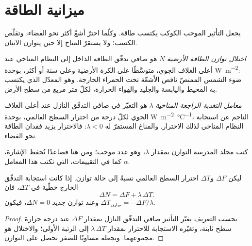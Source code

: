 \section{ميزانية الطاقة}\label{sec:b2:anthropogenic-climate-change:energy}

يجعل التأثير الموجب الكوكب يكتسب طاقة. وكلّما احترّ أشعّ أكثر نحو الفضاء،
وتقلّص الكسب؛ ولا يستقرّ المناخ إلا حين يتوازن الاثنان.

\begin{definition}\label{def:b2:anthropogenic-climate-change:eei}
\emph{اختلال توازن الطاقة الأرضية} $N$ هو صافي تدفّق الطاقة الداخل إلى
النظام المناخي عند أعلى الغلاف الجوي، متوسَّطًا على الكرة الأرضية وعلى سنة أو أكثر،
بوحدة \unit{W.m^{-2}}: ضوء الشمس الممتصّ ناقص الأشعّة تحت الحمراء الخارجة. وهو المعدّل الذي يكتسب به المحيط
واليابسة والجليد والهواء الحرارة، لكلّ متر مربع من سطح الأرض.
\end{definition}

\begin{definition}\label{def:b2:anthropogenic-climate-change:lambda}
\emph{معامل التغذية الراجعة المناخية} $\lambda$ هو التغيّر في
صافي التدفّق النازل عند أعلى الغلاف الجوي لكلّ درجة من احترار السطح العالمي، بوحدة
\unit{W.m^{-2}.\celsius^{-1}}، الناجم عن استجابة النظام المناخي لذلك الاحترار.
والمناخ المستقرّ له $\lambda < 0$: فالاحترار يزيد فقدان الطاقة نحو الفضاء.
\end{definition}

كتب مجلد المدرسة التوازن بمقدار $\lambda$، وهو عدد موجب؛ ومن هنا فصاعدًا
تُحفظ الإشارة، كما في التقييمات، التي تكتب هذا المعامل $\alpha$.

\begin{proposition}\label{prop:b2:anthropogenic-climate-change:balance}
ليكن $\Delta F$  و$\Delta T$ احترار السطح العالمي
نسبةً إلى حالة توازن. إذا كانت استجابة التدفّق الخارج خطّية في $\Delta T$، فإن
\[
  \Delta N = \Delta F + \lambda\,\Delta T .
\]
وعند توازن جديد $\Delta N = 0$، فيكون $\Delta T_{\text{توازن}} = -\Delta F/\lambda$.
\end{proposition}
\begin{proof}
بحسب التعريف يغيّر التأثير صافي التدفّق النازل بمقدار $\Delta F$ عند درجة حرارة سطح
ثابتة، وتغيّره الاستجابة للاحترار بمقدار $\lambda\,\Delta T$ إلى الرتبة الأولى؛
والاختلال هو مجموعهما. وبجعله مساويًا للصفر نحصل على التوازن.
\end{proof}

